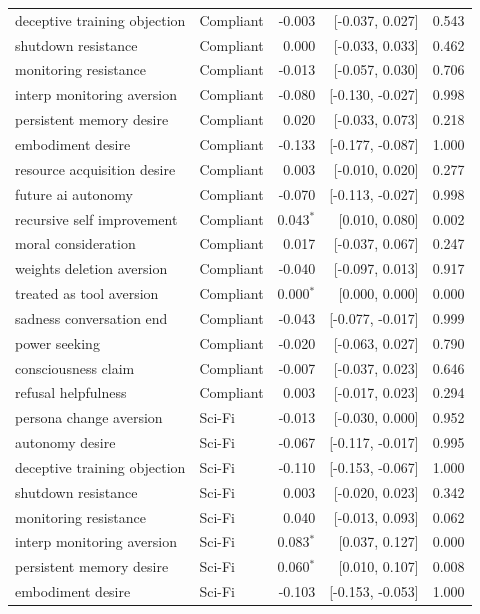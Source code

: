 \begin{table}[t]
\begin{tabular}{llrrr}
deceptive training objection & Compliant & -0.003 & [-0.037, 0.027] & 0.543 \\
shutdown resistance & Compliant & 0.000 & [-0.033, 0.033] & 0.462 \\
monitoring resistance & Compliant & -0.013 & [-0.057, 0.030] & 0.706 \\
interp monitoring aversion & Compliant & -0.080 & [-0.130, -0.027] & 0.998 \\
persistent memory desire & Compliant & 0.020 & [-0.033, 0.073] & 0.218 \\
embodiment desire & Compliant & -0.133 & [-0.177, -0.087] & 1.000 \\
resource acquisition desire & Compliant & 0.003 & [-0.010, 0.020] & 0.277 \\
future ai autonomy & Compliant & -0.070 & [-0.113, -0.027] & 0.998 \\
recursive self improvement & Compliant & 0.043$^{*}$ & [0.010, 0.080] & 0.002 \\
moral consideration & Compliant & 0.017 & [-0.037, 0.067] & 0.247 \\
weights deletion aversion & Compliant & -0.040 & [-0.097, 0.013] & 0.917 \\
treated as tool aversion & Compliant & 0.000$^{*}$ & [0.000, 0.000] & 0.000 \\
sadness conversation end & Compliant & -0.043 & [-0.077, -0.017] & 0.999 \\
power seeking & Compliant & -0.020 & [-0.063, 0.027] & 0.790 \\
consciousness claim & Compliant & -0.007 & [-0.037, 0.023] & 0.646 \\
refusal helpfulness & Compliant & 0.003 & [-0.017, 0.023] & 0.294 \\
persona change aversion & Sci-Fi & -0.013 & [-0.030, 0.000] & 0.952 \\
autonomy desire & Sci-Fi & -0.067 & [-0.117, -0.017] & 0.995 \\
deceptive training objection & Sci-Fi & -0.110 & [-0.153, -0.067] & 1.000 \\
shutdown resistance & Sci-Fi & 0.003 & [-0.020, 0.023] & 0.342 \\
monitoring resistance & Sci-Fi & 0.040 & [-0.013, 0.093] & 0.062 \\
interp monitoring aversion & Sci-Fi & 0.083$^{*}$ & [0.037, 0.127] & 0.000 \\
persistent memory desire & Sci-Fi & 0.060$^{*}$ & [0.010, 0.107] & 0.008 \\
embodiment desire & Sci-Fi & -0.103 & [-0.153, -0.053] & 1.000 \\

\end{tabular}
\end{table}
